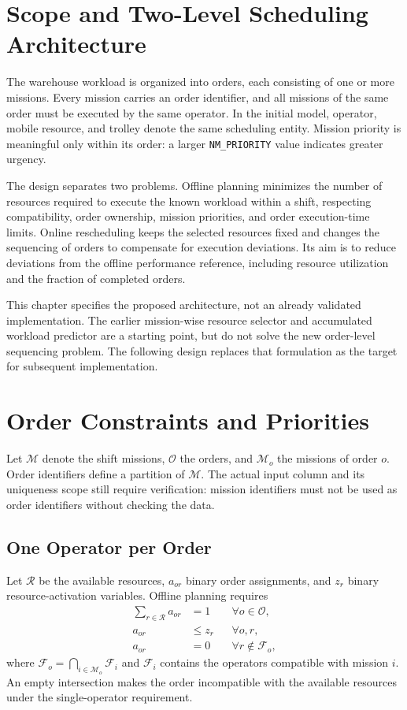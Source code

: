 \section{Scope and Two-Level Scheduling Architecture}
\label{sec:order_scheduling_scope}

The warehouse workload is organized into orders, each consisting of one or
more missions. Every mission carries an order identifier, and all missions
of the same order must be executed by the same operator. In the initial
model, operator, mobile resource, and trolley denote the same scheduling
entity. Mission priority is meaningful only within its order: a larger
\texttt{NM\_PRIORITY} value indicates greater urgency.

The design separates two problems. Offline planning minimizes the number of
resources required to execute the known workload within a shift, respecting
compatibility, order ownership, mission priorities, and order execution-time
limits. Online rescheduling keeps the selected resources fixed and changes
the sequencing of orders to compensate for execution deviations. Its aim is
to reduce deviations from the offline performance reference, including
resource utilization and the fraction of completed orders.

This chapter specifies the proposed architecture, not an already validated
implementation. The earlier mission-wise resource selector and accumulated
workload predictor are a starting point, but do not solve the new order-level
sequencing problem. The following design replaces that formulation as the
target for subsequent implementation.

\section{Order Constraints and Priorities}

Let $\mathcal M$ denote the shift missions, $\mathcal O$ the orders, and
$\mathcal M_o$ the missions of order $o$. Order identifiers define a partition
of $\mathcal M$. The actual input column and its uniqueness scope still
require verification: mission identifiers must not be used as order
identifiers without checking the data.

\subsection{One Operator per Order}

Let $\mathcal R$ be the available resources, $a_{or}$ binary order assignments,
and $z_r$ binary resource-activation variables. Offline planning requires
\begin{align}
 \sum_{r\in\mathcal R}a_{or}&=1 &&\forall o\in\mathcal O,\\
 a_{or}&\leq z_r &&\forall o,r,\\
 a_{or}&=0 &&\forall r\notin\mathcal F_o,
\end{align}
where $\mathcal F_o=\bigcap_{i\in\mathcal M_o}\mathcal F_i$ and
$\mathcal F_i$ contains the operators compatible with mission $i$.
An empty intersection makes the order incompatible with the available
resources under the single-operator requirement.

